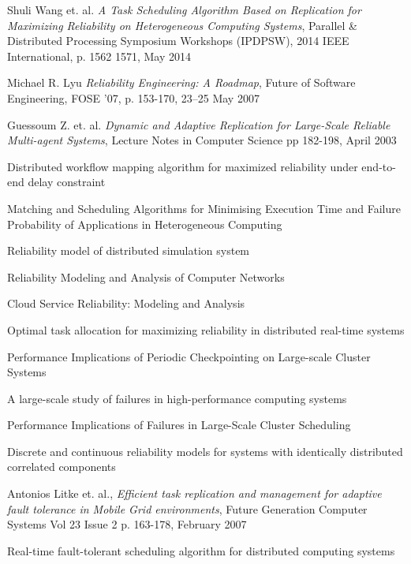 \documentclass{cslthse-msc}
\begin{document}
\begin{thebibliography}{50}
	Shuli Wang et. al.
	\emph{A Task Scheduling Algorithm Based on Replication for Maximizing Reliability on Heterogeneous Computing Systems},
	Parallel \& Distributed Processing Symposium Workshops (IPDPSW), 2014 IEEE International, p. 1562 1571, 
	May 2014

	Michael R. Lyu
	\emph{Reliability Engineering: A Roadmap},
	Future of Software Engineering, FOSE ’07, p. 153-170,
	23–25 May 2007
	
	Guessoum Z. et. al.
	\emph{Dynamic and Adaptive Replication for Large-Scale Reliable Multi-agent Systems},
	Lecture Notes in Computer Science pp 182-198,
	April 2003

Distributed workflow mapping algorithm for maximized reliability under end-to-end delay constraint

Matching and Scheduling Algorithms for Minimising Execution Time and Failure Probability of Applications in Heterogeneous Computing

Reliability model of distributed simulation system

Reliability Modeling and Analysis of Computer Networks

Cloud Service Reliability: Modeling and Analysis

Optimal task allocation for maximizing reliability in distributed real-time systems

Performance Implications of Periodic Checkpointing on Large-scale Cluster Systems

A large-scale study of failures in high-performance computing systems

Performance Implications of Failures in Large-Scale Cluster Scheduling

Discrete and continuous reliability models for systems with identically distributed correlated components

	Antonios Litke et. al.,	
	\emph{Efficient task replication and management for adaptive fault tolerance in Mobile Grid environments},
	Future Generation Computer Systems Vol 23 Issue 2 p. 163-178,
	February 2007

Real-time fault-tolerant scheduling algorithm for distributed computing systems


\end{thebibliography}
\end{document}
